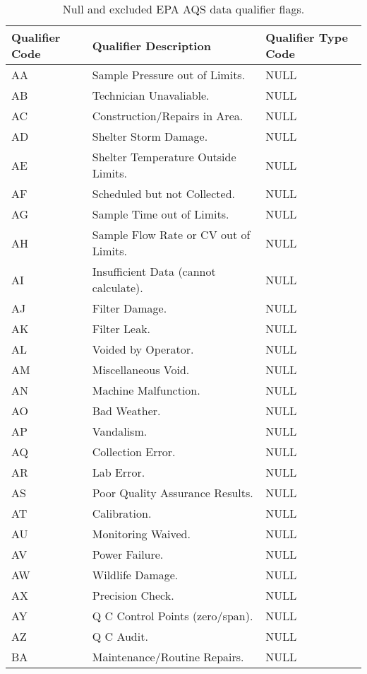 \begin{longtable}{lll}
\caption{Null and excluded EPA AQS data qualifier flags.}
\label{tab:excluded_qualifiers}\\
Qualifier Code & Qualifier Description & Qualifier Type Code \\
\endfirsthead
%
\endhead
%
AA & Sample Pressure out of Limits. & NULL \\
AB & Technician Unavaliable. & NULL \\
AC & Construction/Repairs in Area. & NULL \\
AD & Shelter Storm Damage. & NULL \\
AE & Shelter Temperature Outside Limits. & NULL \\
AF & Scheduled but not Collected. & NULL \\
AG & Sample Time out of Limits. & NULL \\
AH & Sample Flow Rate or CV out of Limits. & NULL \\
AI & Insufficient Data (cannot calculate). & NULL \\
AJ & Filter Damage. & NULL \\
AK & Filter Leak. & NULL \\
AL & Voided by Operator. & NULL \\
AM & Miscellaneous Void. & NULL \\
AN & Machine Malfunction. & NULL \\
AO & Bad Weather. & NULL \\
AP & Vandalism. & NULL \\
AQ & Collection Error. & NULL \\
AR & Lab Error. & NULL \\
AS & Poor Quality Assurance Results. & NULL \\
AT & Calibration. & NULL \\
AU & Monitoring Waived. & NULL \\
AV & Power Failure. & NULL \\
AW & Wildlife Damage. & NULL \\
AX & Precision Check. & NULL \\
AY & Q C Control Points (zero/span). & NULL \\
AZ & Q C Audit. & NULL \\
BA & Maintenance/Routine Repairs. & NULL \\

\end{longtable}
